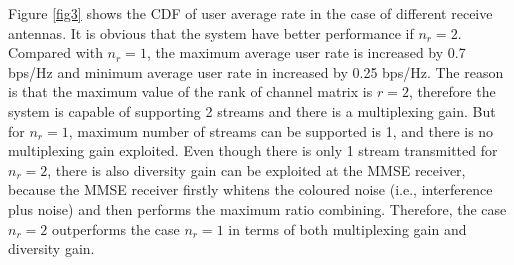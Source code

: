 \documentclass[10pt,conference]{IEEEtran}
\begin{document}
\begin{table} [htb]
    \caption{Baseline Parameters}
    \centering
\end{table}

Figure \ref{fig3} shows the CDF of user average rate in the case of 
different receive antennas. It is obvious that the system have better performance
if $n_r=2$. Compared with $n_r=1$, the maximum average user rate is increased by 
0.7 bps/Hz and minimum average user rate in increased by 0.25 bps/Hz.
The reason is that the maximum value of the rank of channel 
matrix is $r=2$, therefore the system is capable of supporting 
2 streams and there is a multiplexing gain. But for $n_r=1$, maximum number of streams
can be supported is 1, and there is no multiplexing gain exploited. Even though there is only
1 stream transmitted for $n_r=2$, there is also diversity gain can be exploited at the 
MMSE receiver, because the MMSE receiver firstly whitens the coloured 
noise (i.e., interference plus noise) and then performs the maximum ratio combining. 
Therefore, the case $n_r=2$ outperforms the case $n_r=1$ in terms of both
multiplexing gain and diversity gain.

\end{document}

